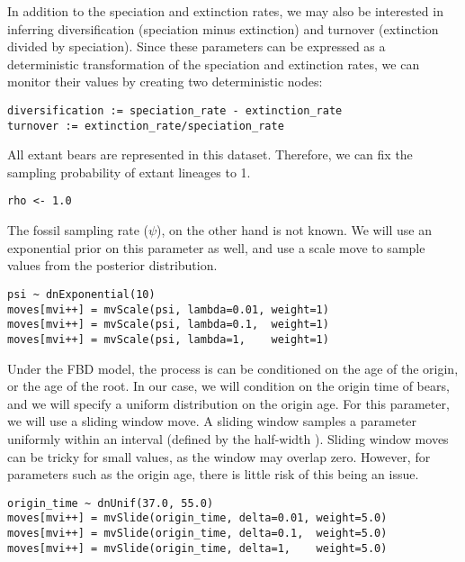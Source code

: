 In addition to the speciation and extinction rates, we may also be interested in inferring diversification (speciation minus extinction) and turnover (extinction divided by speciation). Since these parameters can be expressed as a deterministic transformation of the speciation and extinction rates, we can monitor their values by creating two deterministic nodes:
{\tt \begin{snugshade*}
\begin{lstlisting}
diversification := speciation_rate - extinction_rate
turnover := extinction_rate/speciation_rate
\end{lstlisting}
\end{snugshade*}}

All extant bears are represented in this dataset. 
Therefore, we can fix the sampling probability of extant lineages to 1.

{\tt \begin{snugshade*}
\begin{lstlisting}
rho <- 1.0
\end{lstlisting}
\end{snugshade*}}

The fossil sampling rate ($\psi$), on the other hand is not known. 
We will use an exponential prior on this parameter as well, and use a scale move to sample values from the posterior distribution.

{\tt \begin{snugshade*}
\begin{lstlisting}
psi ~ dnExponential(10) 
moves[mvi++] = mvScale(psi, lambda=0.01, weight=1)
moves[mvi++] = mvScale(psi, lambda=0.1,  weight=1)
moves[mvi++] = mvScale(psi, lambda=1,    weight=1)
\end{lstlisting}
\end{snugshade*}}

Under the FBD model, the process is can be conditioned on the age of the origin, or the age of the root.
In our case, we will condition on the origin time of bears, and
we will specify a uniform distribution on the origin age.
For this parameter, we will use a sliding window move. A sliding window samples a parameter uniformly within an interval (defined by the half-width ). 
Sliding window moves can be tricky for small values, as the window may overlap zero. 
However, for parameters such as the origin age, there is little risk of this being an issue.

{\tt \begin{snugshade*}
\begin{lstlisting}
origin_time ~ dnUnif(37.0, 55.0)
moves[mvi++] = mvSlide(origin_time, delta=0.01, weight=5.0)
moves[mvi++] = mvSlide(origin_time, delta=0.1,  weight=5.0)
moves[mvi++] = mvSlide(origin_time, delta=1,    weight=5.0)
\end{lstlisting}
\end{snugshade*}}

